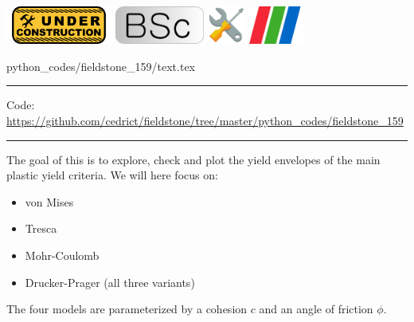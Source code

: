 \noindent
\includegraphics[height=1.25cm]{images/pictograms/under_construction}
\includegraphics[height=1.25cm]{images/pictograms/bsc}
\includegraphics[height=1.25cm]{images/pictograms/tools}
\includegraphics[height=1.25cm]{images/pictograms/paraview}


\begin{flushright} {\tiny {\color{gray} python\_codes/fieldstone\_159/text.tex}} \end{flushright}

%

\par\noindent\rule{\textwidth}{0.4pt}

\begin{center}
\inpython
{\small Code: \url{https://github.com/cedrict/fieldstone/tree/master/python_codes/fieldstone_159}}
\end{center}

\par\noindent\rule{\textwidth}{0.4pt}


The goal of this \stone is to explore, check and plot the yield envelopes of 
the main plastic yield criteria.
We will here focus on:
\begin{itemize} 
\item von Mises
\item Tresca
\item Mohr-Coulomb
\item Drucker-Prager (all three variants)
\end{itemize} 
The four models are parameterized by a cohesion $c$ and an angle of friction $\phi$. 

